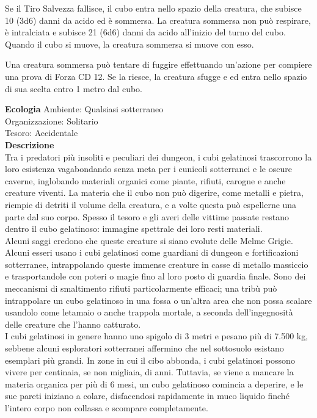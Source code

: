 \begin{multicols}{2}
Se il Tiro Salvezza fallisce, il cubo entra nello spazio della creatura, che subisce 10 (3d6) danni da acido ed è sommersa. La creatura sommersa non può respirare, è intralciata e subisce 21 (6d6) danni da acido all'inizio del turno del cubo. Quando il cubo si muove, la creatura sommersa si muove con esso.

Una creatura sommersa può tentare di fuggire effettuando un'azione per compiere una prova di Forza CD 12. Se la riesce, la creatura sfugge e ed entra nello spazio di sua scelta entro 1 metro dal cubo.

\textbf{Ecologia}
Ambiente: Qualsiasi sotterraneo\\
Organizzazione: Solitario\\
Tesoro: Accidentale\\
\textbf{Descrizione}\\
Tra i predatori più insoliti e peculiari dei dungeon, i cubi gelatinosi trascorrono la loro esistenza vagabondando senza meta per i cunicoli sotterranei e le oscure caverne, inglobando materiali organici come piante, rifiuti, carogne e anche creature viventi. La materia che il cubo non può digerire, come metalli e pietra, riempie di detriti il volume della creatura, e a volte questa può espellerne una parte dal suo corpo. Spesso il tesoro e gli averi delle vittime passate restano dentro il cubo gelatinoso: immagine spettrale dei loro resti materiali.\\

Alcuni saggi credono che queste creature si siano evolute delle Melme Grigie. Alcuni esseri usano i cubi gelatinosi come guardiani di dungeon e fortificazioni sotterranee, intrappolando queste immense creature in casse di metallo massiccio e trasportandole con poteri o magie fino al loro posto di guardia finale. Sono dei meccanismi di smaltimento rifiuti particolarmente efficaci; una tribù può intrappolare un cubo gelatinoso in una fossa o un'altra area che non possa scalare usandolo come letamaio o anche trappola mortale, a seconda dell'ingegnosità delle creature che l'hanno catturato.\\

I cubi gelatinosi in genere hanno uno spigolo di 3 metri e pesano più di 7.500 kg, sebbene alcuni esploratori sotterranei affermino che nel sottosuolo esistano esemplari più grandi. In zone in cui il cibo abbonda, i cubi gelatinosi possono vivere per centinaia, se non migliaia, di anni. Tuttavia, se viene a mancare la materia organica per più di 6 mesi, un cubo gelatinoso comincia a deperire, e le sue pareti iniziano a colare, disfacendosi rapidamente in muco liquido finché l'intero corpo non collassa e scompare completamente.\\



\end{multicols}
